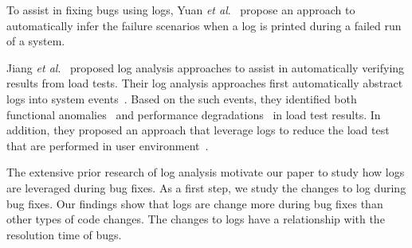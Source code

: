 To assist in fixing bugs using logs, Yuan \emph{et al$.$}~\cite{Yuan:2010:SED:1736020.1736038} propose an approach to automatically infer the failure scenarios when a log is printed during a failed run of a system.


Jiang \textsl{et al$.$}~\cite{Jiang:2008:AAA:1400155.1400158,JiangICSM2008,JiangICSM20092,Jiang:2010:ICS:1850000.1850068} proposed log analysis approaches to assist in automatically verifying results from load tests. Their log analysis approaches first automatically abstract logs into system events~\cite{Jiang:2008:AAA:1400155.1400158}. Based on the such events, they identified both functional anomalies~\cite{JiangICSM2008} and performance degradations~\cite{JiangICSM20092} in load test results. In addition, they proposed an approach that leverage logs to reduce the load test that are performed in user environment~\cite{Jiang:2010:ICS:1850000.1850068}.



The extensive prior research of log analysis motivate our paper to study how logs are leveraged during bug fixes. As a first step, we study the changes to log during bug fixes. Our findings show that logs are change more during bug fixes than other types of code changes. The changes to logs have a relationship with the resolution time of bugs.





